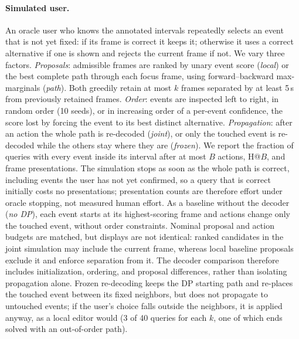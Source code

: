 \paragraph{Simulated user.}
An oracle user who knows the annotated intervals repeatedly selects an event that is not yet fixed: if its frame is correct it keeps it; otherwise it uses a correct alternative if one is shown and rejects the current frame if not.
We vary three factors.
\emph{Proposals}: admissible frames are ranked by unary event score (\emph{local}) or the best complete path through each focus frame, using forward--backward max-marginals (\emph{path}).
Both greedily retain at most $k$ frames separated by at least 5\,s from previously retained frames.
\emph{Order}: events are inspected left to right, in random order (10 seeds), or in increasing order of a per-event confidence, the score lost by forcing the event to its best distinct alternative.
\emph{Propagation}: after an action the whole path is re-decoded (\emph{joint}), or only the touched event is re-decoded while the others stay where they are (\emph{frozen}).
We report the fraction of queries with every event inside its interval after at most $B$ actions, H@$B$, and frame presentations.
The simulation stops as soon as the whole path is correct, including events the user has not yet confirmed, so a query that is correct initially costs no presentations; presentation counts are therefore effort under oracle stopping, not measured human effort.
As a baseline without the decoder (\emph{no DP}), each event starts at its highest-scoring frame and actions change only the touched event, without order constraints.
Nominal proposal and action budgets are matched, but displays are not identical: ranked candidates in the joint simulation may include the current frame, whereas local baseline proposals exclude it and enforce separation from it.
The decoder comparison therefore includes initialization, ordering, and proposal differences, rather than isolating propagation alone.
Frozen re-decoding keeps the DP starting path and re-places the touched event between its fixed neighbors, but does not propagate to untouched events; if the user's choice falls outside the neighbors, it is applied anyway, as a local editor would (3 of 40 queries for each $k$, one of which ends solved with an out-of-order path).

